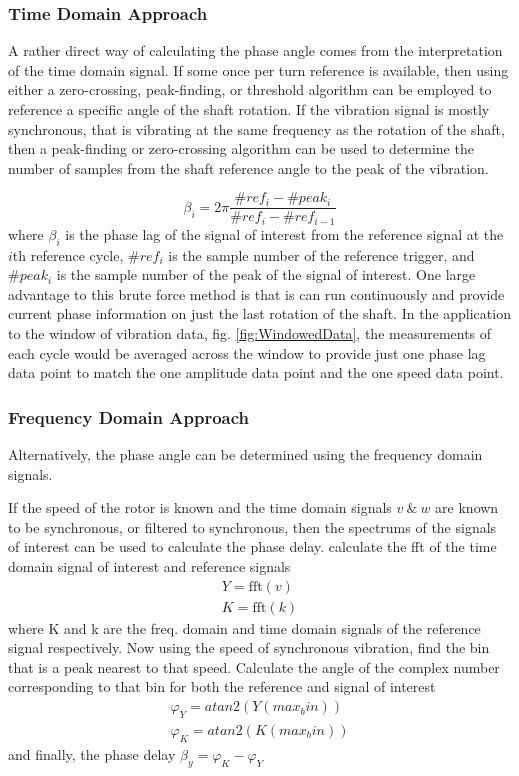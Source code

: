 \subsubsection{Time Domain Approach}
A rather direct way of calculating the phase angle comes from the interpretation of the time domain signal. If some once per turn reference is available, then using either a zero-crossing, peak-finding, or threshold algorithm can be employed to reference a specific angle of the shaft rotation. If the vibration signal is mostly synchronous, that is vibrating at the same frequency as the rotation of the shaft, then a peak-finding or zero-crossing algorithm can be used to determine the number of samples from the shaft reference angle to the peak of the vibration.\par 
\begin{equation}\label{eq:PhaseAngleTimeDomain}
\beta_i = 2\pi\frac{\#ref_i-\#peak_i}{\#ref_i-\#ref_{i-1}}
\end{equation}
where $ \beta_i $ is the phase lag of the signal of interest from the reference signal at the $ i $th reference cycle, $ \#ref_i $ is the sample number of the reference trigger, and $ \#peak_i $ is the sample number of the peak of the signal of interest. One large advantage to this brute force method is that is can run continuously and provide current phase information on just the last rotation of the shaft. In the application to the window of vibration data, fig. \ref{fig:WindowedData}, the measurements of each cycle would be averaged across the window to provide just one phase lag data point to match the one amplitude data point and the one speed data point.\par 
\subsubsection{Frequency Domain Approach}
Alternatively, the phase angle can be determined using the frequency domain signals.\par 
If the speed of the rotor is known and the time domain signals $ v\ \&\ w $ are known to be synchronous, or filtered to synchronous, then the spectrums of the signals of interest can be used to calculate the phase delay. calculate the fft of the time domain signal of interest and reference signals
\begin{equation*}
\begin{array}{c}
Y = \text{fft}(v)\\
K = \text{fft}(k)
\end{array}
\end{equation*}
where K and k are the freq. domain and time domain signals of the reference signal respectively. Now using the speed of synchronous vibration, find the bin that is a peak nearest to that speed. Calculate the angle of the complex number corresponding to that bin for both the reference and signal of interest
\begin{equation*}
\begin{array}{c}
\varphi_Y = atan2(Y(max_bin))\\
\varphi_K = atan2(K(max_bin))
\end{array}
\end{equation*} 
and finally, the phase delay $ \beta_y=\varphi_K-\varphi_Y $
